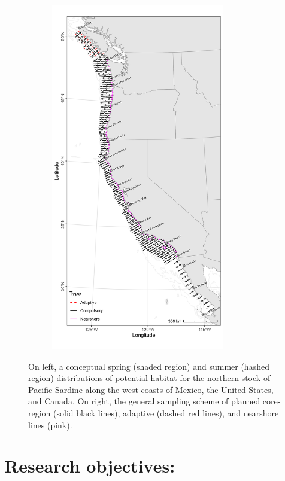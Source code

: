 \documentclass[
  letterpaper,
  oneside,
  open=any]{scrbook}
\begin{document}
\begin{figure}
\begin{minipage}{0.50\linewidth}
\begin{figure}[H]
{\centering \includegraphics[width=\textwidth,height=6in]{content/images/fig_survey_map.png}

}


\end{figure}%

\end{minipage}%

\caption{\label{fig-survey}On left, a conceptual spring (shaded region)
and summer (hashed region) distributions of potential habitat for the
northern stock of Pacific Sardine along the west coasts of Mexico, the
United States, and Canada. On right, the general sampling scheme of
planned core-region (solid black lines), adaptive (dashed red lines),
and nearshore lines (pink).}

\end{figure}%

\section{Research objectives:}\label{research-objectives}
\end{document}

